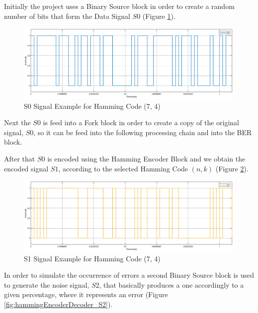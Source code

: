 \begin{refsection}
Initially the project uses a Binary Source block in order to create a random number of bits that form the Data Signal $S0$ (Figure \ref{fig:hammingEncoderDecoder_S0}).

\begin{figure}[h!]
	\centering
	\includegraphics[width=.9\linewidth]{./sdf/eit_25828_hamming_channel_encoder_decoder/images/S0.png}
	\vspace{-3mm}
	\caption{S0 Signal Example for Hamming Code (7, 4)}
	\label{fig:hammingEncoderDecoder_S0}
\end{figure}

Next the $S0$ is feed into a Fork block in order to create a copy of the original signal, $S0$, so it can be feed into the following processing chain and into the BER block.

After that $S0$ is encoded using the Hamming Encoder Block and we obtain the encoded signal $S1$, according to the selected Hamming Code $(n, k)$ (Figure \ref{fig:hammingEncoderDecoder_S1}).

\begin{figure}[h!]
	\centering
	\includegraphics[width=.9\linewidth]{./sdf/eit_25828_hamming_channel_encoder_decoder/images/S1.png}
	\vspace{-3mm}
	\caption{S1 Signal Example for Hamming Code (7, 4)}
	\label{fig:hammingEncoderDecoder_S1}
\end{figure}

In order to simulate the occurrence of errors a second Binary Source block is used to generate the noise signal, $S2$, that basically produces a one accordingly to a given percentage, where it represents an error (Figure \ref{fig:hammingEncoderDecoder_S2}).


\end{refsection}
